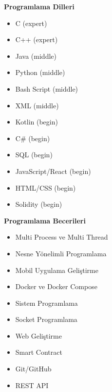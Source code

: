 \documentclass[a4paper,11pt]{article}
\begin{document}
\noindent
\begin{minipage}[t]{0.48\textwidth}
    \textbf{Programlama Dilleri}
    \vspace{0.5em}
    \begin{itemize}[leftmargin=2em]
        \item C (expert)
        \item C++ (expert)
        \item Java (middle)
        \item Python (middle)
        \item Bash Script (middle)
        \item XML (middle)
        \item Kotlin (begin)
        \item C\# (begin)
        \item SQL (begin)
		\item JavaScript/React (begin)
		\item HTML/CSS (begin)
        \item Solidity (begin)
    \end{itemize}
\end{minipage}%
\hfill
\begin{minipage}[t]{0.48\textwidth}
    \textbf{Programlama Becerileri}
    \vspace{0.5em}
    \begin{itemize}[leftmargin=2em]
        \item Multi Process ve Multi Thread
        \item Nesne Yönelimli Programlama
        \item Mobil Uygulama Geliştirme
        \item Docker ve Docker Compose
		\item Sistem Programlama
        \item Socket Programlama
		\item Web Geliştirme
		\item Smart Contract
        \item Git/GitHub	
		\item REST API
    \end{itemize}
\end{minipage}
\end{document}
